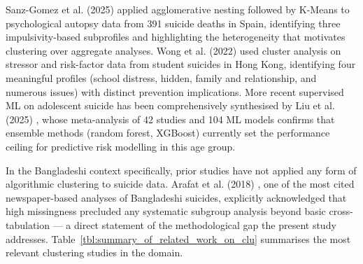 Sanz-Gomez et al. (2025) \cite{ref36} applied agglomerative nesting followed by K-Means to psychological autopsy data from 391 suicide deaths in Spain, identifying three impulsivity-based subprofiles and highlighting the heterogeneity that motivates clustering over aggregate analyses. Wong et al. (2022) \cite{ref37} used cluster analysis on stressor and risk-factor data from student suicides in Hong Kong, identifying four meaningful profiles (school distress, hidden, family and relationship, and numerous issues) with distinct prevention implications. More recent supervised ML on adolescent suicide has been comprehensively synthesised by Liu et al. (2025) \cite{ref53}, whose meta-analysis of 42 studies and 104 ML models confirms that ensemble methods (random forest, XGBoost) currently set the performance ceiling for predictive risk modelling in this age group.

In the Bangladeshi context specifically, prior studies have not applied any form of algorithmic clustering to suicide data. Arafat et al. (2018) \cite{ref4}, one of the most cited newspaper-based analyses of Bangladeshi suicides, explicitly acknowledged that high missingness precluded any systematic subgroup analysis beyond basic cross-tabulation --- a direct statement of the methodological gap the present study addresses. Table~\ref{tbl:summary_of_related_work_on_clu} summarises the most relevant clustering studies in the domain.

